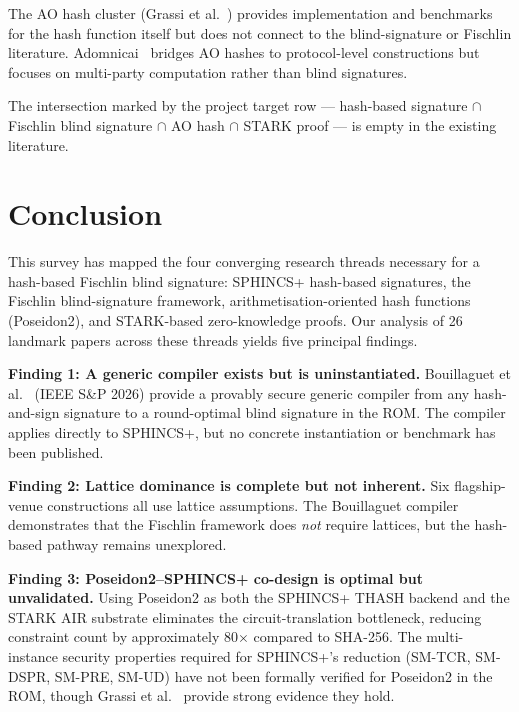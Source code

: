 \documentclass[11pt,a4paper]{article}
\newcommand{\ROM}{\textsf{ROM}}
\begin{document}
The AO hash cluster (Grassi et al.~\cite{Grassi2023Poseidon2,Grassi2019Poseidon,
Grassi2024Monolith,Grassi2026Poseidon2b}) provides implementation and benchmarks for the
hash function itself but does not connect to the blind-signature or Fischlin literature.
Adomnicai~\cite{Adomnicai2026} bridges AO hashes to protocol-level constructions but focuses
on multi-party computation rather than blind signatures.

The intersection marked by the project target row --- hash-based signature $\cap$ Fischlin
blind signature $\cap$ AO hash $\cap$ STARK proof --- is empty in the existing literature.

\section{Conclusion}
\label{sec:conclusion}

This survey has mapped the four converging research threads necessary for a hash-based Fischlin
blind signature: SPHINCS+ hash-based signatures, the Fischlin blind-signature framework,
arithmetisation-oriented hash functions (Poseidon2), and STARK-based zero-knowledge proofs.
Our analysis of 26 landmark papers across these threads yields five principal findings.

\medskip\noindent\textbf{Finding 1: A generic compiler exists but is uninstantiated.}
Bouillaguet et al.~\cite{Bouillaguet2026BlindingPH} (IEEE S\&P 2026) provide a provably secure
generic compiler from any hash-and-sign signature to a round-optimal blind signature in the
\ROM.  The compiler applies directly to SPHINCS+, but no concrete instantiation or benchmark
has been published.

\medskip\noindent\textbf{Finding 2: Lattice dominance is complete but not inherent.}
Six flagship-venue constructions \cite{delPino2022Framework,Beullens2023LatticeBlind,
Agrawal2022Practical,Katsumata2021,Kastner2024PairingFree,Fuchsbauer2015Practical} all use
lattice assumptions.  The Bouillaguet compiler demonstrates that the Fischlin framework does
\emph{not} require lattices, but the hash-based pathway remains unexplored.

\medskip\noindent\textbf{Finding 3: Poseidon2--SPHINCS+ co-design is optimal but unvalidated.}
Using Poseidon2 as both the SPHINCS+ THASH backend and the STARK AIR substrate eliminates the
circuit-translation bottleneck, reducing constraint count by approximately 80$\times$ compared
to SHA-256.  The multi-instance security properties required for SPHINCS+'s reduction (SM-TCR,
SM-DSPR, SM-PRE, SM-UD) have not been formally verified for Poseidon2 in the \ROM, though
Grassi et al.~\cite{Grassi2023Poseidon2,Grassi2019Poseidon} provide strong evidence they hold.
\end{document}

